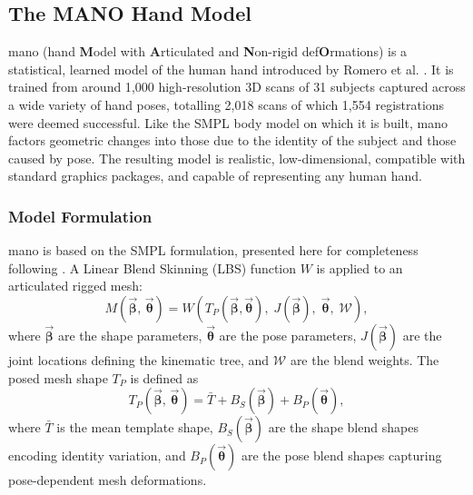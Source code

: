 \subsection{The MANO Hand Model}\label{subsec:mano}

\acrshort{mano} (hand \textbf{M}odel with \textbf{A}rticulated and \textbf{N}on-rigid
def\textbf{O}rmations) is a statistical, learned model of the human hand
introduced by Romero et al. \cite{MANO:SIGGRAPHASIA:2017}.
It is trained from around 1{,}000 high-resolution 3D scans of 31 subjects
captured across a wide variety of hand poses, totalling 2{,}018 scans of
which 1{,}554 registrations were deemed successful.
Like the SMPL body model \cite{SMPL:2015} on which it is built, \acrshort{mano}
factors geometric changes into those due to the identity of the subject and
those caused by pose.
The resulting model is realistic, low-dimensional, compatible with standard
graphics packages, and capable of representing any human hand.

\subsubsection{Model Formulation}

\acrshort{mano} is based on the SMPL formulation, presented here for completeness
following \cite{SMPL:2015}.
A Linear Blend Skinning (LBS) function $W$ is applied to an articulated
rigged mesh:
\begin{equation}\label{eq:mano_full}
  M(\vec{\boldsymbol{\beta}},\,\vec{\boldsymbol{\theta}})
  = W\!\left(
      T_P(\vec{\boldsymbol{\beta}},\vec{\boldsymbol{\theta}}),\;
      J(\vec{\boldsymbol{\beta}}),\;
      \vec{\boldsymbol{\theta}},\;
      \mathcal{W}
    \right),
\end{equation}
where $\vec{\boldsymbol{\beta}}$ are the shape parameters,
$\vec{\boldsymbol{\theta}}$ are the pose parameters,
$J(\vec{\boldsymbol{\beta}})$ are the joint locations defining the kinematic
tree, and $\mathcal{W}$ are the blend weights.
The posed mesh shape $T_P$ is defined as
\begin{equation}\label{eq:mano_tp}
  T_P(\vec{\boldsymbol{\beta}},\,\vec{\boldsymbol{\theta}})
  = \bar{T} + B_S(\vec{\boldsymbol{\beta}}) + B_P(\vec{\boldsymbol{\theta}}),
\end{equation}
where $\bar{T}$ is the mean template shape, $B_S(\vec{\boldsymbol{\beta}})$
are the shape blend shapes encoding identity variation, and
$B_P(\vec{\boldsymbol{\theta}})$ are the pose blend shapes capturing
pose-dependent mesh deformations.

